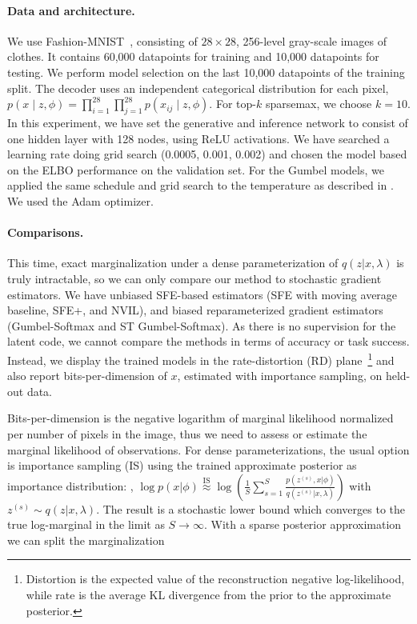 \paragraph*{Data and architecture.} We use
Fashion-MNIST~\citep{fmnist}, consisting of $28 \times 28$, 256-level
gray-scale images of clothes. It contains 60,000 datapoints for
training and 10,000 datapoints for testing. We perform model
selection on the last 10,000 datapoints of the training split. The
decoder uses an independent categorical distribution for each pixel,
$p(x \mid z, \phi) = \prod_{i=1}^{28} \prod_{j=1}^{28} p(x_{ij} \mid
    z, \phi)$. For top-$k$ sparsemax, we choose $k=10$. In this
experiment, we have set the generative and inference network to
consist of one hidden layer with 128 nodes, using ReLU activations.
We have searched a learning rate doing grid search (0.0005, 0.001,
0.002) and chosen the model based on the ELBO performance on the
validation set. For the Gumbel models, we applied the same schedule
and grid search to the temperature as described in .
We used the Adam optimizer.

\paragraph*{Comparisons.} This time, exact marginalization under a
dense parameterization of $q (z | x, \lambda)$ is truly intractable,
so we can only compare our method to stochastic gradient estimators.
We have unbiased SFE-based estimators (SFE with moving average
baseline, SFE+, and NVIL), and biased reparameterized gradient
estimators (Gumbel-Softmax and ST Gumbel-Softmax). As there is no
supervision for the latent code, we cannot compare the methods in
terms of accuracy or task success. Instead, we display the trained
models in the rate-distortion (RD)
plane~\citep{Alemi2018}\footnote{Distortion is the expected value of
    the reconstruction negative log-likelihood, while rate is the average
    KL divergence from the prior to the approximate posterior.} and also
report bits-per-dimension of $x$, estimated with importance sampling,
on held-out data.

Bits-per-dimension is the negative logarithm of marginal likelihood
normalized per number of pixels in the image, thus we need to assess
or estimate the marginal likelihood of observations. For dense
parameterizations, the usual option is importance sampling (IS) using
the trained approximate posterior as importance distribution: \ie,
$\log p(x|\phi) \overset{\text{IS}}{\approx} \log \left(\frac{1}{S}
    \sum_{s=1}^S \frac{p(z^{(s)}, x|\phi)}{q(z^{(s)} | x, \lambda)}
    \right)$ with $z^{(s)} \sim q(z|x, \lambda)$. The result is a
stochastic lower bound which converges to the true log-marginal in
the limit as $S \to \infty$. With a sparse posterior approximation we
can split the marginalization

